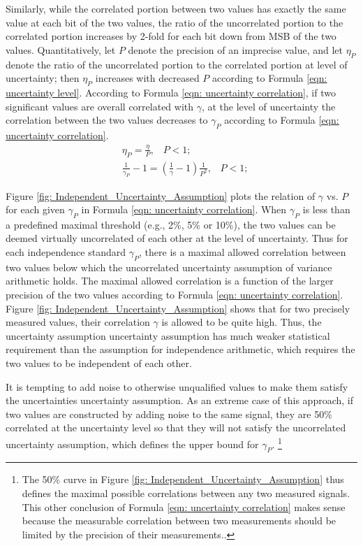 \documentclass[twoside]{article}
\numberwithin{equation}{section}
\newcommand{\eqspace}{\;\;\;}
\begin{document}
Similarly, while the correlated portion between two values has exactly the same value at each bit of the two values, the ratio of the uncorrelated portion to the correlated portion increases by 2-fold for each bit down from MSB of the two values. 
Quantitatively, let $P$ denote the precision of an imprecise value, and let $\eta_{P}$ denote the ratio of the uncorrelated portion to the correlated portion at level of uncertainty; then $\eta_{P}$ increases with decreased $P$ according to Formula \eqref{eqn: uncertainty level}. 
According to Formula \eqref{eqn: uncertainty correlation}, if two significant values are overall correlated with $\gamma$, at the level of uncertainty the correlation between the two values decreases to $\gamma_P$ according to Formula \eqref{eqn: uncertainty correlation}.
\begin{align}
\label{eqn: uncertainty level}
& \eta_{P} = \frac{\eta}{P}, \eqspace P < 1; \\
\label{eqn: uncertainty correlation}
& \frac{1}{\gamma_{P}} - 1 = \left(\frac{1}{\gamma} -1\right) \frac{1}{P^2}, \eqspace P < 1;
\end{align}

Figure \ref{fig: Independent_Uncertainty_Assumption} plots the relation of $\gamma$ vs. $P$ for each given $\gamma_{P}$ in Formula \eqref{eqn: uncertainty correlation}.  
When $\gamma_{P}$ is less than a predefined maximal threshold (e.g., 2\%, 5\% or 10\%), the two values can be deemed virtually uncorrelated of each other at the level of uncertainty.  
Thus for each independence standard $\gamma_{P}$, there is a maximal allowed correlation between two values below which the uncorrelated uncertainty assumption of variance arithmetic holds.  
The maximal allowed correlation is a function of the larger precision of the two values according to Formula \eqref{eqn: uncertainty correlation}.  
Figure \ref{fig: Independent_Uncertainty_Assumption} shows that for two precisely measured values, their correlation $\gamma$ is allowed to be quite high.  
Thus, the uncertainty assumption uncertainty assumption has much weaker statistical requirement than the assumption for independence arithmetic, which requires the two values to be independent of each other.

It is tempting to add noise to otherwise unqualified values to make them satisfy the uncertainties uncertainty assumption.  
As an extreme case of this approach, if two values are constructed by adding noise to the same signal, they are 50\% correlated at the uncertainty level so that they will not satisfy the uncorrelated uncertainty assumption, which defines the upper bound for $\gamma_{P}$. 
\footnote{
The 50\% curve in Figure \ref{fig: Independent_Uncertainty_Assumption} thus defines the maximal possible correlations between any two measured signals. 
This other conclusion of Formula \eqref{eqn: uncertainty correlation} makes sense because the measurable correlation between two measurements should be limited by the precision of their measurements..
}
\end{document}
